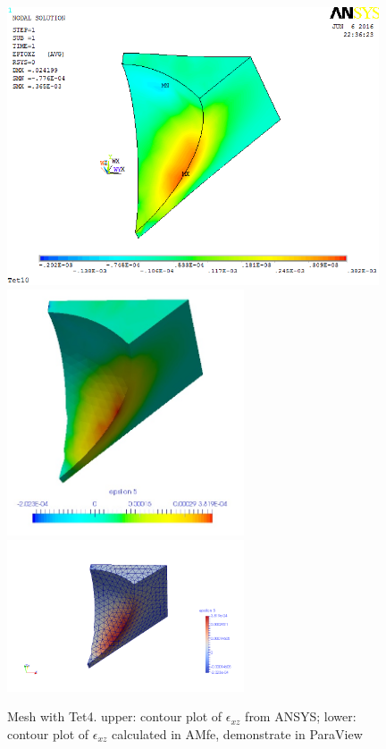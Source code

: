 \begin{figure}[htbp]
	\begin{center}
		\includegraphics[width=11cm,clip]{Tet4Exz.png} 	
		\includegraphics[width=7cm,clip]{Tet4ExzPD.png} 	
		\includegraphics[width=7cm,clip]{Tet4ExzP.png} 		
		\caption{Mesh with Tet4. upper: contour plot of $\epsilon_{xz}$ from ANSYS; lower: contour plot of $\epsilon_{xz}$ calculated in AMfe, demonstrate in ParaView} \label{fig: Tet4Exz}
	\end{center}
\end{figure}
\clearpage 

